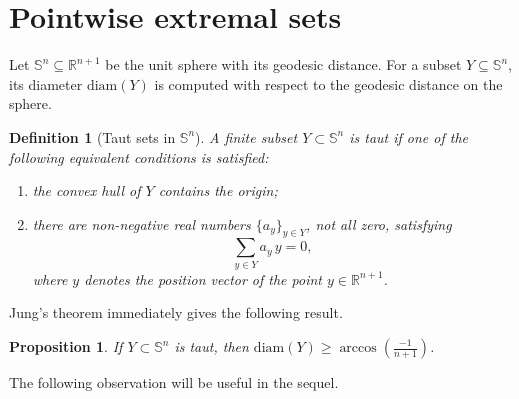 \documentclass[12pt]{amsart}
\theoremstyle{plain}
\newtheorem{proposition}[theorem]{Proposition}
\newtheorem{definition}[theorem]{Definition}
\newcommand{\R}{\mathbb{R}}
\newcommand{\Sp}{\mathbb{S}}
\newcommand{\diam}{\mathrm{diam}}
\numberwithin{equation}{section}
\begin{document}
\section{Pointwise extremal sets}


Let $\Sp^n\subseteq\R^{n+1}$ be the unit sphere with its geodesic
distance.  For a subset $Y\subseteq\Sp^n$, its diameter $\diam(Y)$ is
computed with respect to the geodesic distance on the sphere.

\begin{definition}[Taut sets in $\Sp^n$]
A finite subset $Y\subset \Sp^n$ is \emph{taut} if one of the
following equivalent conditions is satisfied:
\begin{enumerate}
\item
the convex hull of $Y$ contains the origin;
\item
there are non-negative real numbers $\{a_y\}_{y\in Y}$, not all zero,
satisfying
\[
\sum_{y\in Y}{a_y \, y} = 0,
\]
where $y$ denotes the position vector of the point $y\in \R^{n+1}$.
\end{enumerate}
\end{definition}



	 Jung's theorem immediately gives the following result.
	\begin{proposition}\label{prop:Jung}
		If $Y\subset \Sp^{n}$ is taut, then $\diam(Y)\geq \arccos\left(\frac{-1}{n+1}\right)$.
	\end{proposition}



The following observation will be useful in the sequel.
\end{document}
